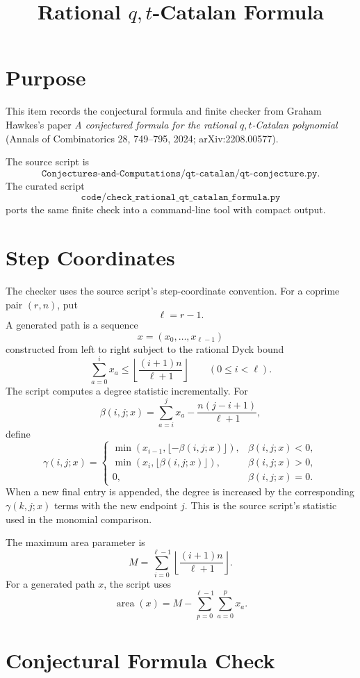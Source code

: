 \documentclass{article}
\title{Rational \(q,t\)-Catalan Formula}
\author{}
\date{}
\begin{document}
\maketitle

\section{Purpose}

This item records the conjectural formula and finite checker from Graham
Hawkes's paper \emph{A conjectured formula for the rational
\(q,t\)-Catalan polynomial} (Annals of Combinatorics 28, 749--795, 2024;
arXiv:2208.00577).

The source script is
\[
  \texttt{Conjectures-and-Computations/qt-catalan/qt-conjecture.py}.
\]
The curated script
\[
  \texttt{code/check\_rational\_qt\_catalan\_formula.py}
\]
ports the same finite check into a command-line tool with compact output.

\section{Step Coordinates}

The checker uses the source script's step-coordinate convention.  For a
coprime pair \((r,n)\), put
\[
  \ell=r-1.
\]
A generated path is a sequence
\[
  x=(x_0,\ldots,x_{\ell-1})
\]
constructed from left to right subject to the rational Dyck bound
\[
  \sum_{a=0}^{i} x_a
  \le
  \left\lfloor\frac{(i+1)n}{\ell+1}\right\rfloor
  \qquad(0\le i<\ell).
\]
The script computes a degree statistic incrementally.  For
\[
  \beta(i,j;x)=\sum_{a=i}^{j}x_a-\frac{n(j-i+1)}{\ell+1},
\]
define
\[
  \gamma(i,j;x)=
  \begin{cases}
    \min(x_{i-1},\lfloor-\beta(i,j;x)\rfloor), & \beta(i,j;x)<0,\\
    \min(x_i,\lfloor\beta(i,j;x)\rfloor), & \beta(i,j;x)>0,\\
    0, & \beta(i,j;x)=0.
  \end{cases}
\]
When a new final entry is appended, the degree is increased by the corresponding
\(\gamma(k,j;x)\) terms with the new endpoint \(j\).  This is the source
script's statistic used in the monomial comparison.

The maximum area parameter is
\[
  M=\sum_{i=0}^{\ell-1}
  \left\lfloor\frac{(i+1)n}{\ell+1}\right\rfloor .
\]
For a generated path \(x\), the script uses
\[
  \operatorname{area}(x)
  =
  M-\sum_{p=0}^{\ell-1}\sum_{a=0}^{p}x_a.
\]

\section{Conjectural Formula Check}
\end{document}
